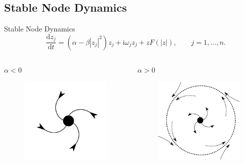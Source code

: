 \documentclass[10pt,reqno]{beamer}
\newcommand{\D}[2]{\frac{\mathrm{d} #1}{\mathrm{d} #2}}
\newcommand{\I}{\mathrm{i}}
\begin{document}
\subsection{Stable Node Dynamics}
\begin{frame}{Stable Node Dynamics}
\[
\quad \D{z_j}{t} = (\alpha - \beta|z_j|^2)z_j + \I\omega_jz_j +zF(|z|), \qquad j = 1,\ldots, n.
\]
\vfill
\begin{columns}
	\begin{column}{.49\textwidth}
				\begin{tcolorbox}[notitle, boxrule=1pt, colback=white]
		\centering $\alpha <0$
		\begin{figure}
			\includegraphics[scale = 0.16]{node.png}
		\end{figure}
			\end{tcolorbox}
	\end{column}
	\begin{column}{.49\textwidth}
			\centering
			$\alpha >0$
			\begin{figure}
				\includegraphics[scale = 0.16]{hopf.png}

\end{figure}
\end{column}
\end{columns}
\end{frame}
\end{document}
